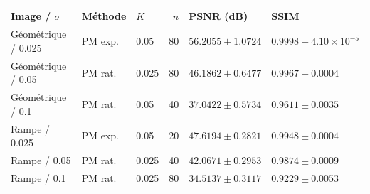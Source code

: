 \begin{tabular}{lllrll}
\toprule
Image / $\sigma$ & Méthode & $K$ & $n$ & PSNR (dB) & SSIM \\
\midrule
Géométrique / 0.025 & PM exp. & 0.05 & 80 & $56.2055 \pm 1.0724$ & $0.9998 \pm 4.10\times10^{-5}$ \\
Géométrique / 0.05 & PM rat. & 0.025 & 80 & $46.1862 \pm 0.6477$ & $0.9967 \pm 0.0004$ \\
Géométrique / 0.1 & PM rat. & 0.05 & 40 & $37.0422 \pm 0.5734$ & $0.9611 \pm 0.0035$ \\
Rampe / 0.025 & PM exp. & 0.05 & 20 & $47.6194 \pm 0.2821$ & $0.9948 \pm 0.0004$ \\
Rampe / 0.05 & PM rat. & 0.025 & 40 & $42.0671 \pm 0.2953$ & $0.9874 \pm 0.0009$ \\
Rampe / 0.1 & PM rat. & 0.025 & 80 & $34.5137 \pm 0.3117$ & $0.9229 \pm 0.0053$ \\
\bottomrule
\end{tabular}
